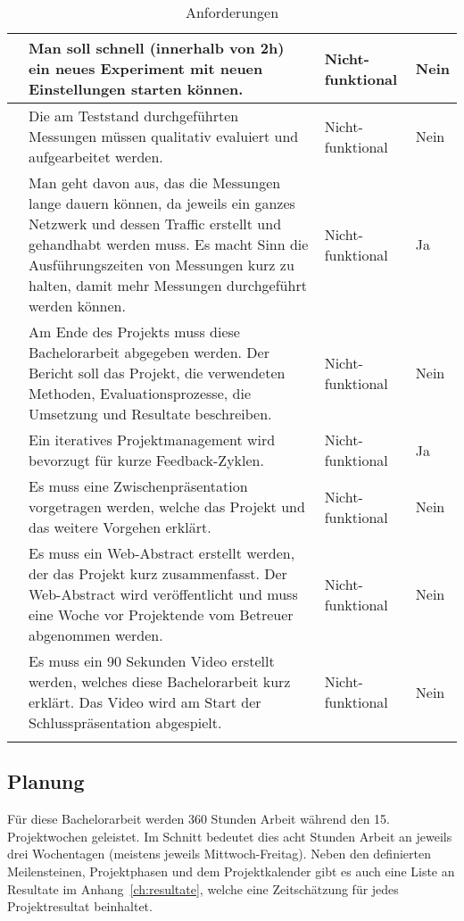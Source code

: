 \begin{longtable}{N p{8.5cm} l l}
      & Man soll schnell (innerhalb von 2h) ein neues Experiment mit neuen Einstellungen starten können. & Nicht-funktional & Nein \\ \midrule
      & Die am Teststand durchgeführten Messungen müssen qualitativ evaluiert und aufgearbeitet werden.  & Nicht-funktional & Nein \\ \midrule
      & Man geht davon aus, das die Messungen lange dauern können, da jeweils ein ganzes Netzwerk und dessen Traffic erstellt und gehandhabt werden muss. Es macht Sinn die Ausführungszeiten von Messungen kurz zu halten, damit mehr Messungen durchgeführt werden können. & Nicht-funktional & Ja \\ \midrule
      & Am Ende des Projekts muss diese Bachelorarbeit abgegeben werden. Der Bericht soll das Projekt, die verwendeten Methoden, Evaluationsprozesse, die Umsetzung und Resultate beschreiben.
                & Nicht-funktional & Nein \\ \midrule
      & Ein iteratives Projektmanagement wird bevorzugt für kurze Feedback-Zyklen. & Nicht-funktional & Ja \\ \midrule
      & Es muss eine Zwischenpräsentation vorgetragen werden, welche das Projekt und das weitere Vorgehen erklärt.
                & Nicht-funktional & Nein \\ \midrule
      & Es muss ein Web-Abstract erstellt werden, der das Projekt kurz zusammenfasst. Der Web-Abstract wird veröffentlicht und muss eine Woche vor Projektende vom Betreuer abgenommen werden.
                & Nicht-funktional & Nein \\ \midrule
      & Es muss ein 90 Sekunden Video erstellt werden, welches diese Bachelorarbeit kurz erklärt. Das Video wird am Start der Schlusspräsentation abgespielt.
                & Nicht-funktional & Nein \\ \midrule
    \bottomrule
    \caption{Anforderungen}\label{tab:anforderungen}
\end{longtable}

\subsection{Planung}
\label{sec:Planung}

Für diese Bachelorarbeit werden 360 Stunden Arbeit während den 15. Projektwochen geleistet.
Im Schnitt bedeutet dies acht Stunden Arbeit an jeweils drei Wochentagen (meistens jeweils Mittwoch-Freitag).
Neben den definierten Meilensteinen, Projektphasen und dem Projektkalender gibt es auch eine Liste an Resultate im Anhang~\ref{ch:resultate}, welche eine Zeitschätzung für jedes Projektresultat beinhaltet.

